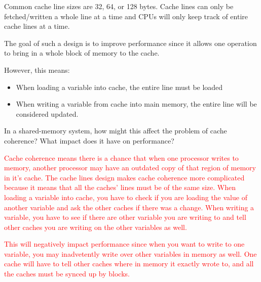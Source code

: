 \documentclass[a4paper]{article}
\begin{document}
\begin{enumerate}
		Common cache line sizes are 32, 64, or 128 bytes.
		Cache lines can only be fetched/written a whole line at a time and CPUs will only keep track of entire cache lines at a time.
		
		The goal of such a design is to improve performance since it allows one operation to bring in a whole block of memory to the cache.
		
		However, this means:
		\begin{itemize}
			\item When loading a variable into cache, the entire line must be loaded
			\item When writing a variable from cache into main memory, the entire line will be considered updated.
		\end{itemize}

		In a shared-memory system, how might this affect the problem of cache coherence? 
		What impact does it have on performance?

		\textcolor{red}{
			Cache coherence means there is a chance that when one processor writes to memory, another processor may have an outdated copy of that region of memory in it's cache.
			The cache lines design makes cache coherence more complicated because it means that all the caches' lines must be of the same size.
			When loading a variable into cache, you have to check if you are loading the value of another variable and ask the other caches if there was a change.
			When writing a variable, you have to see if there are other variable you are writing to and tell other caches you are writing on the other variables as well.\\
		}

		\textcolor{red}{
			This will negatively impact performance since when you want to write to one variable, you may inadvetently write over other variables in memory as well.
			One cache will have to tell other caches where in memory it exactly wrote to, and all the caches must be synced up by blocks.
		}

\end{enumerate}
\end{document}
